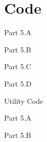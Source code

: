 \documentclass{article}
\begin{document}
	\newpage
	\section{Code}
	
	Part 5.A
	
	\newpage
	
	Part 5.B
	
	\newpage
	
	Part 5.C
	
	\newpage
	
	Part 5.D
	
	\newpage
	
	Utility Code
	
	\newpage
	
	Part 5.A
	
	\newpage
	
	Part 5.B
	
	\newpage
	
	
	\newpage
	
	
	
	
	
	
	
	
\end{document}
